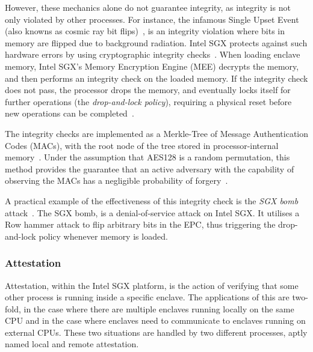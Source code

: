 \documentclass{article}
\begin{document}
			However, these mechanics alone do not guarantee integrity, as integrity is not only violated by other processes.
			For instance, the infamous Single Upset Event (also knowns as cosmic ray bit flips)~\cite{normand_single_1996}, is an integrity violation where bits in memory are flipped due to background radiation.
			Intel SGX protects against such hardware errors by using cryptographic integrity checks~\cite{gueron_memory_2016}.
			When loading enclave memory, Intel SGX's Memory Encryption Engine (MEE) decrypts the memory, and then performs an integrity check on the loaded memory.
			If the integrity check does not pass, the processor drops the memory, and eventually locks itself for further operations (the \textit{drop-and-lock policy}), requiring a physical reset before new operations can be completed~\cite{jang_sgx-bomb_2017}.

			The integrity checks are implemented as a Merkle-Tree of Message Authentication Codes (MACs), with the root node of the tree stored in processor-internal memory~\cite{jang_sgx-bomb_2017}.
			Under the assumption that AES128 is a random permutation, this method provides the guarantee that an active adversary with the capability of observing the MACs has a negligible probability of forgery~\cite{gueron_memory_2016}.

			A practical example of the effectiveness of this integrity check is the \textit{SGX bomb} attack~\cite{jang_sgx-bomb_2017}.
			The SGX bomb, is a denial-of-service attack on Intel SGX.
			It utilises a Row hammer attack to flip arbitrary bits in the EPC, thus triggering the drop-and-lock policy whenever memory is loaded.

			\subsubsection{Attestation}
			\label{subsec:attestation}

			Attestation, within the Intel SGX platform, is the action of verifying that some other process is running inside a specific enclave.
			The applications of this are two-fold, in the case where there are multiple enclaves running locally on the same CPU and in the case where enclaves need to communicate to enclaves running on external CPUs.
			These two situations are handled by two different processes, aptly named local and remote attestation.
\end{document}
